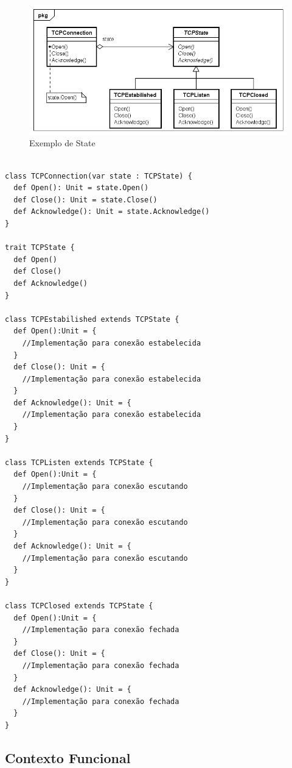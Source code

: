 \begin{figure}[htb]
	\caption{\label{state_exemplo}Exemplo de State}
	\begin{center}
	    \includegraphics[scale=0.5]{5_padroes-contexto-funcional/5.3_comportamentais/5.3.08_state/state_exemplo.png}
	\end{center}
\end{figure}

\begin{lstlisting}[caption={State Orientação a Objetos},label=oostate]

class TCPConnection(var state : TCPState) {
  def Open(): Unit = state.Open()
  def Close(): Unit = state.Close()
  def Acknowledge(): Unit = state.Acknowledge()
}

trait TCPState {
  def Open()
  def Close()
  def Acknowledge()
}

class TCPEstabilished extends TCPState {
  def Open():Unit = {
    //Implementação para conexão estabelecida
  }
  def Close(): Unit = {
    //Implementação para conexão estabelecida
  }
  def Acknowledge(): Unit = {
    //Implementação para conexão estabelecida
  }
}

class TCPListen extends TCPState {
  def Open():Unit = {
    //Implementação para conexão escutando
  }
  def Close(): Unit = {
    //Implementação para conexão escutando
  }
  def Acknowledge(): Unit = {
    //Implementação para conexão escutando
  }
}

class TCPClosed extends TCPState {
  def Open():Unit = {
    //Implementação para conexão fechada
  }
  def Close(): Unit = {
    //Implementação para conexão fechada
  }
  def Acknowledge(): Unit = {
    //Implementação para conexão fechada
  }
}

\end{lstlisting}

\subsection*{Contexto Funcional}

